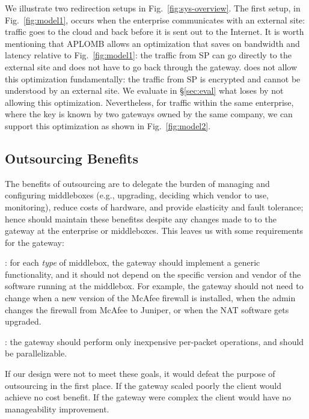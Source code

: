 We illustrate two redirection setups in Fig.~\ref{fig:sys-overview}.  The first setup, in Fig.~\ref{fig:model1},  occurs when the enterprise communicates with an external site: traffic goes to the cloud and back before it is sent out to the Internet. 
It is worth mentioning that APLOMB allows an optimization that saves on bandwidth and latency relative to Fig.~\ref{fig:model1}: the traffic from SP can go directly to the external site and does not have to go back through the gateway. \sys does not allow this optimization fundamentally: the traffic from SP is encrypted and cannot be understood by an external site. We evaluate in \S\ref{sec:eval} what \sys loses by not allowing this optimization. 
Nevertheless, for traffic within the same enterprise, where the key is known by two gateways owned by the same company, we can support this optimization as shown in Fig.~\ref{fig:model2}.


\subsection{Outsourcing Benefits}

The benefits of outsourcing are to delegate the burden of managing and configuring
middleboxes (e.g., upgrading, deciding which vendor to use, monitoring), reduce costs of hardware,
and provide elasticity and fault tolerance; hence \sys should maintain these benefitss despite any changes made to to the gateway at the enterprise or middleboxes.
%
This leaves us with some requirements for the gateway: 

: for each {\em type} of middlebox, the gateway should implement a generic functionality, and it should not depend on the specific version and vendor of the software running at the middlebox. For example, the gateway should not need to change when a new version of the McAfee firewall is installed, when the admin changes the firewall  from McAfee to Juniper, or when the NAT software gets upgraded. 

: the gateway should perform only inexpensive per-packet operations, and should be parallelizable.  

If our design were not to meet these goals, it would defeat the purpose of outsourcing in the first place. If the gateway scaled poorly the client would achieve no cost benefit. If the gateway were complex the client would have no manageability improvement.




